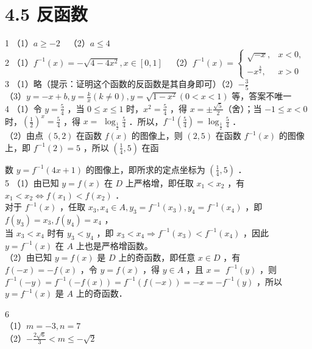 \documentclass[10pt]{article}
\begin{document}
\section*{4.5 反函数}
1 （1）\(a \geqslant-2 \quad\)（2）\(a \leqslant 4\)\\
2 （1）\(f^{-1}(x)=-\sqrt{4-4 x^{2}}, x \in[0,1] \quad\)（2）\(f^{-1}(x)= \begin{cases}\sqrt{-x}, & x<0, \\ -x^{\frac{3}{2}}, & x>0\end{cases}\)\\
3 （1）略（提示：证明这个函数的反函数是其自身即可）（2）\(-\frac{3}{5}\)\\
（3）\(y=-x+b, y=\frac{k}{x}(k \neq 0), y=\sqrt{1-x^{2}}(0<x<1)\) 等，答案不唯一\\
4 （1）令 \(y=\frac{5}{4}\) ，当 \(0 \leqslant x \leqslant 1\) 时，\(x^{2}=\frac{5}{4}\) ，得 \(x= \pm \frac{\sqrt{5}}{2}\)（舍）；当 \(-1 \leqslant x<0\) 时，\(\left(\frac{1}{2}\right)^{x}=\frac{5}{4}\) ，得 \(x=\) \(\log _{\frac{1}{2}} \frac{5}{4}\) ．所以，\(f^{-1}\left(\frac{5}{4}\right)=\log _{\frac{1}{2}} \frac{5}{4}\) ．\\
（2）由点 \((5,2)\) 在函数 \(f(x)\) 的图像上，则 \((2,5)\) 在函数 \(f^{-1}(x)\) 的图像上，即 \(f^{-1}(2)=5\) ，所以 \(\left(\frac{1}{4}, 5\right)\) 在函

数 \(y=f^{-1}(4 x+1)\) 的图像上，即所求的定点坐标为 \(\left(\frac{1}{4}, 5\right)\) ．\\
5 （1）由已知 \(y=f(x)\) 在 \(D\) 上严格增，即任取 \(x_{1}<x_{2}\) ，有 \(x_{1}<x_{2} \Leftrightarrow f\left(x_{1}\right)<f\left(x_{2}\right)\) ．\\
对于 \(f^{-1}(x)\) ，任取 \(x_{3}, x_{4} \in A, y_{3}=f^{-1}\left(x_{3}\right), y_{4}=f^{-1}\left(x_{4}\right)\) ，即 \(f\left(y_{3}\right)=x_{3}, f\left(y_{4}\right)=x_{4}\) ，\\
当 \(x_{3}<x_{4}\) 时有 \(y_{3}<y_{4}\) ，即 \(x_{3}<x_{4} \Rightarrow f^{-1}\left(x_{3}\right)<f^{-1}\left(x_{4}\right)\) ，因此 \(y=f^{-1}(x)\) 在 \(A\) 上也是严格增函数。\\
（2）由已知 \(y=f(x)\) 是 \(D\) 上的奇函数，即任意 \(x \in D\) ，有 \(f(-x)=-f(x)\) ，令 \(y=f(x)\) ，得 \(y \in A\) ，且 \(x=\) \(f^{-1}(y)\) ，则 \(f^{-1}(-y)=f^{-1}(-f(x))=f^{-1}(f(-x))=-x=-f^{-1}(y)\) ，所以 \(y=f^{-1}(x)\) 是 \(A\) 上的奇函数．

6\\
（1）\(m=-3, n=7\)\\
（2）\(-\frac{2 \sqrt{6}}{3}<m \leqslant-\sqrt{2}\)
\end{document}
